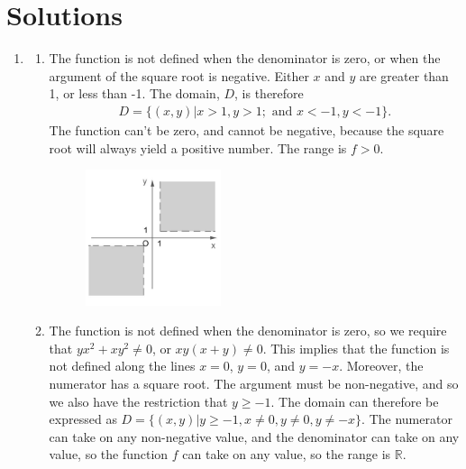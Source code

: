 \documentclass{article}
\begin{document}
\section*{Solutions}
\begin{enumerate}
\item 
\begin{enumerate}
\item The function is not defined when the denominator is zero, or when the argument of the square root is negative. Either $x$ and $y$ are greater than 1, or less than -1. The domain, $D$, is therefore
\begin{align*}D = \{(x,y)|x > 1, y > 1; \text{ and } x < -1, y < -1\}. \end{align*}
The function can't be zero, and cannot be negative, because the square root will always yield a positive number. The range is $f > 0$.  
\begin{figure}[!htbp]
  \begin{center}
    \includegraphics[width=0.4\textwidth]{WA021A.jpg}
  \end{center}
\end{figure}
\item The function is not defined when the denominator is zero, so we require that $yx^2+xy^2\ne0$, or $xy(x+y)\ne0$. This implies that the function is not defined along the lines $x=0$, $y=0$, and $y=-x$. Moreover, the numerator has a square root. The argument must be non-negative, and so we also have the restriction that $y\ge-1$. The domain can therefore be expressed as $D=\{(x,y)| y\ge -1, x\ne0, y\ne0, y\ne-x\}$. The numerator can take on any non-negative value, and the denominator can take on any value, so the function $f$ can take on any value, so the range is $\mathbb{R}$.

\end{enumerate}
\end{enumerate}
\end{document}
